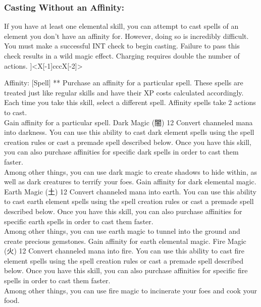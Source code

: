 \begin{pathele}
\subsubsection{Casting Without an Affinity:}
	If you have at least one elemental skill, you can attempt to cast spells of an element you don't have an affinity for. However, doing so is incredibly difficult.
	You must make a successful INT check to begin casting. Failure to pass this check results in a wild magic effect. Charging requires double the number of actions.
]<X[-1]cccX[-2]>


\skilldescription
{Affinity: [Spell]}
{**}
{Purchase an affinity for a particular spell. These spells are treated just like regular skills and have their XP costs calculated accordingly. Each time you take this skill, select a different spell. Affinity spells take 2 actions to cast.\\
}
{Gain affinity for a particular spell.}
\skilldescription
{Dark Magic {\jpfont(闇)}}
{12}
{Convert channeled mana into darkness. You can use this ability to cast dark element spells using the spell creation rules or cast a premade spell described below. Once you have this skill, you can also purchase affinities for specific dark spells in order to cast them faster.\\Among other things, you can use dark magic to create shadows to hide within, as well as dark creatures to terrify your foes.}
{Gain affinity for dark elemental magic.}
\skilldescription
{Earth Magic {\jpfont(土)}}
{12}
{Convert channeled mana into earth. You can use this ability to cast earth element spells using the spell creation rules or cast a premade spell described below. Once you have this skill, you can also purchase affinities for specific earth spells in order to cast them faster.\\Among other things, you can use earth magic to tunnel into the ground and create precious gemstones.}
{Gain affinity for earth elemental magic.}
\skilldescription
{Fire Magic {\jpfont(火)}}
{12}
{Convert channeled mana into fire. You can use this ability to cast fire element spells using the spell creation rules or cast a premade spell described below. Once you have this skill, you can also purchase affinities for specific fire spells in order to cast them faster.\\Among other things, you can use fire magic to incinerate your foes and cook your food.}

\end{pathele}
